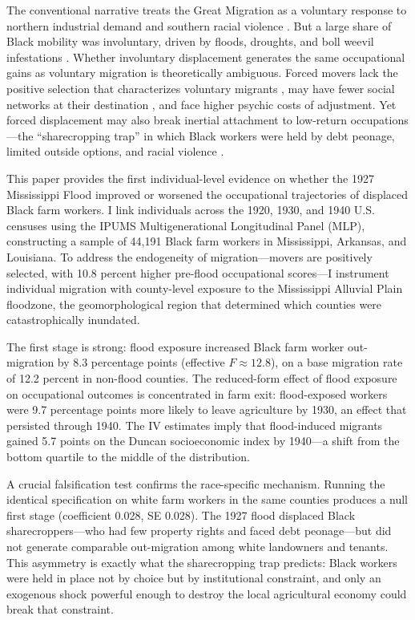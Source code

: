 \documentclass[12pt]{article}
\begin{document}
The conventional narrative treats the Great Migration as a voluntary response to northern industrial demand and southern racial violence \citep{collins_1997, boustan_2010}. But a large share of Black mobility was involuntary, driven by floods, droughts, and boll weevil infestations \citep{hornbeck_naidu_2014, boustan_fishback_kantor_2010}. Whether involuntary displacement generates the same occupational gains as voluntary migration is theoretically ambiguous. Forced movers lack the positive selection that characterizes voluntary migrants \citep{borjas_1987}, may have fewer social networks at their destination \citep{munshi_2003}, and face higher psychic costs of adjustment. Yet forced displacement may also break inertial attachment to low-return occupations---the ``sharecropping trap'' in which Black workers were held by debt peonage, limited outside options, and racial violence \citep{naidu_2010, acemoglu_wolitzky_2011}.

This paper provides the first individual-level evidence on whether the 1927 Mississippi Flood improved or worsened the occupational trajectories of displaced Black farm workers. I link individuals across the 1920, 1930, and 1940 U.S. censuses using the IPUMS Multigenerational Longitudinal Panel (MLP), constructing a sample of 44,191 Black farm workers in Mississippi, Arkansas, and Louisiana. To address the endogeneity of migration---movers are positively selected, with 10.8 percent higher pre-flood occupational scores---I instrument individual migration with county-level exposure to the Mississippi Alluvial Plain floodzone, the geomorphological region that determined which counties were catastrophically inundated.

The first stage is strong: flood exposure increased Black farm worker out-migration by 8.3 percentage points (effective $F \approx 12.8$), on a base migration rate of 12.2 percent in non-flood counties. The reduced-form effect of flood exposure on occupational outcomes is concentrated in farm exit: flood-exposed workers were 9.7 percentage points more likely to leave agriculture by 1930, an effect that persisted through 1940. The IV estimates imply that flood-induced migrants gained 5.7 points on the Duncan socioeconomic index by 1940---a shift from the bottom quartile to the middle of the distribution.

A crucial falsification test confirms the race-specific mechanism. Running the identical specification on white farm workers in the same counties produces a null first stage (coefficient 0.028, SE 0.028). The 1927 flood displaced Black sharecroppers---who had few property rights and faced debt peonage---but did not generate comparable out-migration among white landowners and tenants. This asymmetry is exactly what the sharecropping trap predicts: Black workers were held in place not by choice but by institutional constraint, and only an exogenous shock powerful enough to destroy the local agricultural economy could break that constraint.
\end{document}
